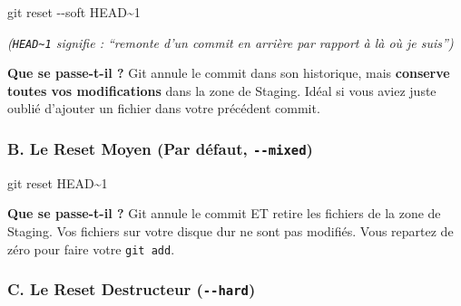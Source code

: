 \documentclass[
  letterpaper,
  DIV=11,
  numbers=noendperiod]{scrreprt}
\newenvironment{Shaded}{\begin{snugshade}}{\end{snugshade}}
\newcommand{\AttributeTok}[1]{\textcolor[rgb]{0.40,0.45,0.13}{#1}}
\newcommand{\FunctionTok}[1]{\textcolor[rgb]{0.28,0.35,0.67}{#1}}
\newcommand{\NormalTok}[1]{\textcolor[rgb]{0.00,0.23,0.31}{#1}}
\begin{document}
\begin{Shaded}
\begin{Highlighting}[]
\FunctionTok{git}\NormalTok{ reset }\AttributeTok{{-}{-}soft}\NormalTok{ HEAD\textasciitilde{}1}
\end{Highlighting}
\end{Shaded}

\emph{(\texttt{HEAD\textasciitilde{}1} signifie : ``remonte d'un commit
en arrière par rapport à là où je suis'')}

\textbf{Que se passe-t-il ?} Git annule le commit dans son historique,
mais \textbf{conserve toutes vos modifications} dans la zone de Staging.
Idéal si vous aviez juste oublié d'ajouter un fichier dans votre
précédent commit.

\subsubsection{\texorpdfstring{B. Le Reset Moyen (Par défaut,
\texttt{-\/-mixed})}{B. Le Reset Moyen (Par défaut, -\/-mixed)}}\label{b.-le-reset-moyen-par-duxe9faut---mixed}

\begin{Shaded}
\begin{Highlighting}[]
\FunctionTok{git}\NormalTok{ reset HEAD\textasciitilde{}1}
\end{Highlighting}
\end{Shaded}

\textbf{Que se passe-t-il ?} Git annule le commit ET retire les fichiers
de la zone de Staging. Vos fichiers sur votre disque dur ne sont pas
modifiés. Vous repartez de zéro pour faire votre \texttt{git\ add}.

\subsubsection{\texorpdfstring{C. Le Reset Destructeur
(\texttt{-\/-hard})}{C. Le Reset Destructeur (-\/-hard)}}\label{c.-le-reset-destructeur---hard}
\end{document}
